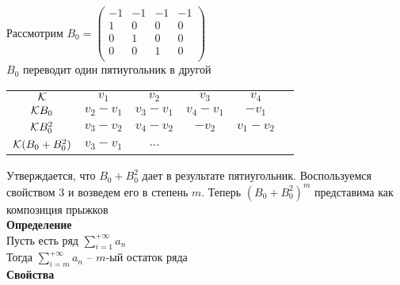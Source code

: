 \documentclass[12pt]{article}
\begin{document}
Рассмотрим $B_0 = \begin{pmatrix}
    -1 & -1 & -1 & -1\\
    1 & 0 & 0 & 0\\
    0 & 1 & 0 & 0\\
    0 & 0 & 1 & 0\\
\end{pmatrix}$\\
$B_0$ переводит один пятиугольник в другой\\
\begin{tabular}{c|ccccc}
    $\mathcal K$ & $v_1$ & $v_2$ & $v_3$ & $v_4$\\
    $\mathcal K B_0$ & $v_2-v_1$ & $v_3-v_1$ & $v_4-v_1$ & $-v_1$\\
    $\mathcal K B_0^2$ & $v_3-v_2$ & $v_4-v_2$ & $-v_2$ & $v_1-v_2$\\
    $\mathcal K (B_0 + B_0^2)$ & $v_3-v_1$ & $\ldots$\\
\end{tabular}
Утверждается, что $B_0 + B_0^2$ дает в результате пятиугольник. Воспользуемся свойством 3 и возведем его в степень $m$. Теперь $(B_0 + B_0^2)^m$ представима как композиция прыжков\\
\textbf{Определение}\\
Пусть есть ряд $\sum_{i=1}^{+\infty} a_n$\\
Тогда $\sum_{i=m}^{+\infty} a_n$ -- $m$-ый остаток ряда\\
\textbf{Свойства}
\end{document}
